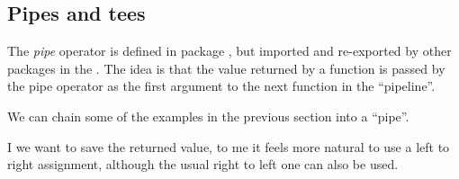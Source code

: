 \documentclass[krantz2]{krantz}\usepackage{knitr}%
\begin{document}
\subsection{Pipes and tees}

The \emph{pipe} operator \Roperator{\%>\%} is defined in package , but imported and re-exported by other packages in the . The idea is that the value returned by a function is passed by the pipe operator as the first argument to the next function in the ``pipeline''.

We can chain some of the examples in the previous section into a ``pipe''.

\begin{knitrout}\footnotesize
{}\color{fgcolor}
\end{knitrout}

I we want to save the returned value, to me it feels more natural to use a left to right assignment, although the usual right to left one can also be used.
\end{document}
